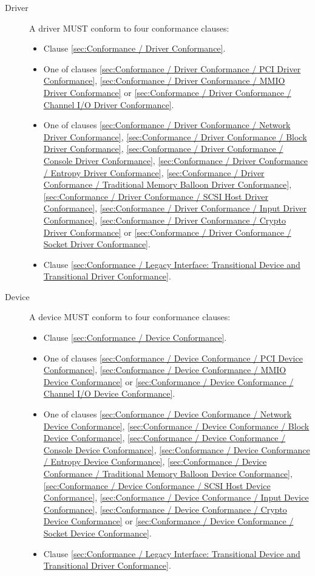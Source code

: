 \begin{description}
\item[Driver] A driver MUST conform to four conformance clauses:
  \begin{itemize}
    \item Clause \ref{sec:Conformance / Driver Conformance}.
    \item One of clauses \ref{sec:Conformance / Driver Conformance / PCI Driver Conformance}, \ref{sec:Conformance / Driver Conformance / MMIO Driver Conformance} or \ref{sec:Conformance / Driver Conformance / Channel I/O Driver Conformance}.
    \item One of clauses \ref{sec:Conformance / Driver Conformance / Network Driver Conformance}, \ref{sec:Conformance / Driver Conformance / Block Driver Conformance}, \ref{sec:Conformance / Driver Conformance / Console Driver Conformance}, \ref{sec:Conformance / Driver Conformance / Entropy Driver Conformance}, \ref{sec:Conformance / Driver Conformance / Traditional Memory Balloon Driver Conformance}, \ref{sec:Conformance / Driver Conformance / SCSI Host Driver Conformance}, \ref{sec:Conformance / Driver Conformance / Input Driver Conformance}, \ref{sec:Conformance / Driver Conformance / Crypto Driver Conformance} or \ref{sec:Conformance / Driver Conformance / Socket Driver Conformance}.
    \item Clause \ref{sec:Conformance / Legacy Interface: Transitional Device and Transitional Driver Conformance}.
  \end{itemize}
\item[Device] A device MUST conform to four conformance clauses:
  \begin{itemize}
    \item Clause \ref{sec:Conformance / Device Conformance}.
    \item One of clauses \ref{sec:Conformance / Device Conformance / PCI Device Conformance}, \ref{sec:Conformance / Device Conformance / MMIO Device Conformance} or \ref{sec:Conformance / Device Conformance / Channel I/O Device Conformance}.
    \item One of clauses \ref{sec:Conformance / Device Conformance / Network Device Conformance}, \ref{sec:Conformance / Device Conformance / Block Device Conformance}, \ref{sec:Conformance / Device Conformance / Console Device Conformance}, \ref{sec:Conformance / Device Conformance / Entropy Device Conformance}, \ref{sec:Conformance / Device Conformance / Traditional Memory Balloon Device Conformance}, \ref{sec:Conformance / Device Conformance / SCSI Host Device Conformance}, \ref{sec:Conformance / Device Conformance / Input Device Conformance}, \ref{sec:Conformance / Device Conformance / Crypto Device Conformance} or \ref{sec:Conformance / Device Conformance / Socket Device Conformance}.
    \item Clause \ref{sec:Conformance / Legacy Interface: Transitional Device and Transitional Driver Conformance}.
  \end{itemize}
\end{description}

